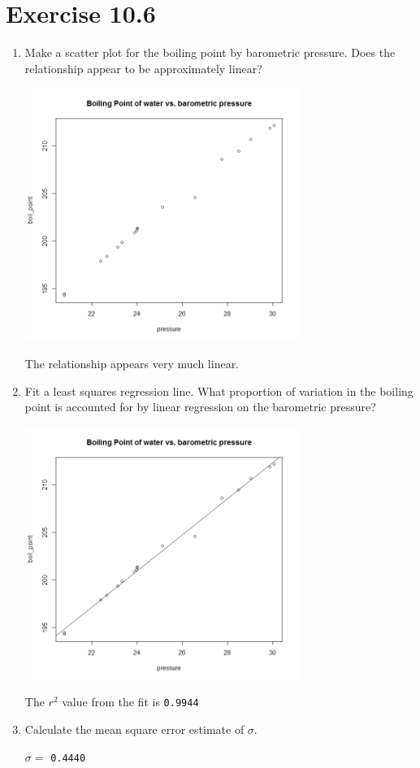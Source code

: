 \documentclass{article}
\begin{document}
\section*{Exercise 10.6}

\begin{enumerate}[\quad(a)]
	\item Make a scatter plot for the boiling point by barometric pressure. Does the relationship appear to be approximately linear?\\
	\begin{center}
		\includegraphics[width=3.5in]{Q41.png}
	\end{center}
	The relationship appears very much linear.
	\item Fit a least squares regression line. What proportion of variation in the boiling point is accounted for by linear regression on the barometric pressure?\\
	\begin{center}
		\includegraphics[width=3.5in]{Q42.png}
	\end{center}

	The $r^2$ value from the fit is \texttt{0.9944}
	\newpage
	\item Calculate the mean square error estimate of $\sigma$.

	$\sigma =$ \texttt{0.4440}
\end{enumerate}
\end{document}
